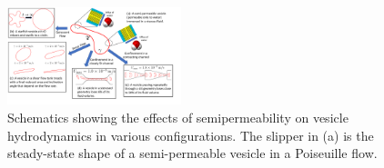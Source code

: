 \documentclass[9pt,twocolumn,twoside,lineno]{pnas-new}
\begin{document}
 
%
\begin{figure}[htp]
  \centering
  \includegraphics[width=0.45\textwidth]{figures/schematic.pdf}
  \caption{\label{fig:sketch} Schematics showing the effects of
  semipermeability on vesicle hydrodynamics in various configurations.
  The slipper in (a) is the steady-state shape of a semi-permeable
  vesicle in a Poiseuille flow.}
\end{figure}
\end{document}
